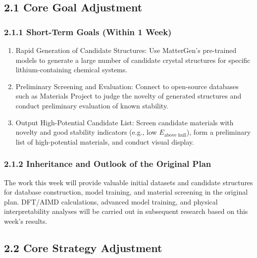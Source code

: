 \documentclass[letterpaper]{article} %
\begin{document}
\subsection{2.1 Core Goal Adjustment}

\subsubsection{2.1.1 Short-Term Goals (Within 1 Week)}
\begin{enumerate}
    \item Rapid Generation of Candidate Structures: Use MatterGen's pre-trained models to generate a large number of candidate crystal structures for specific lithium-containing chemical systems.
    \item Preliminary Screening and Evaluation: Connect to open-source databases such as Materials Project to judge the novelty of generated structures and conduct preliminary evaluation of known stability.
    \item Output High-Potential Candidate List: Screen candidate materials with novelty and good stability indicators (e.g., low $E_{\text{above hull}}$), form a preliminary list of high-potential materials, and conduct visual display.
\end{enumerate}

\subsubsection{2.1.2 Inheritance and Outlook of the Original Plan}
The work this week will provide valuable initial datasets and candidate structures for database construction, model training, and material screening in the original plan. DFT/AIMD calculations, advanced model training, and physical interpretability analyses will be carried out in subsequent research based on this week's results.
\subsection{2.2 Core Strategy Adjustment}
\end{document}
